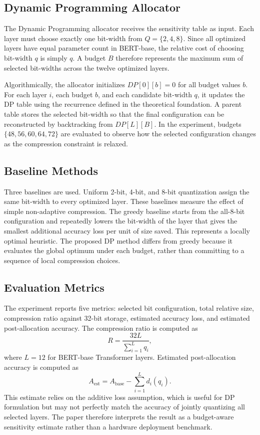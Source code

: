 \documentclass[conference]{IEEEtran}
\begin{document}
\subsection{Dynamic Programming Allocator}
The Dynamic Programming allocator receives the sensitivity table as input. Each layer must choose exactly one bit-width from $Q=\{2,4,8\}$. Since all optimized layers have equal parameter count in BERT-base, the relative cost of choosing bit-width $q$ is simply $q$. A budget $B$ therefore represents the maximum sum of selected bit-widths across the twelve optimized layers.

Algorithmically, the allocator initializes $DP[0][b]=0$ for all budget values $b$. For each layer $i$, each budget $b$, and each candidate bit-width $q$, it updates the DP table using the recurrence defined in the theoretical foundation. A parent table stores the selected bit-width so that the final configuration can be reconstructed by backtracking from $DP[L][B]$. In the experiment, budgets $\{48,56,60,64,72\}$ are evaluated to observe how the selected configuration changes as the compression constraint is relaxed.

\subsection{Baseline Methods}
Three baselines are used. Uniform 2-bit, 4-bit, and 8-bit quantization assign the same bit-width to every optimized layer. These baselines measure the effect of simple non-adaptive compression. The greedy baseline starts from the all-8-bit configuration and repeatedly lowers the bit-width of the layer that gives the smallest additional accuracy loss per unit of size saved. This represents a locally optimal heuristic. The proposed DP method differs from greedy because it evaluates the global optimum under each budget, rather than committing to a sequence of local compression choices.

\subsection{Evaluation Metrics}
The experiment reports five metrics: selected bit configuration, total relative size, compression ratio against 32-bit storage, estimated accuracy loss, and estimated post-allocation accuracy. The compression ratio is computed as
\begin{equation}
R=\frac{32L}{\sum_{i=1}^{L}q_i},
\end{equation}
where $L=12$ for BERT-base Transformer layers. Estimated post-allocation accuracy is computed as
\begin{equation}
A_{\mathrm{est}}=A_{\mathrm{base}}-\sum_{i=1}^{L}d_i(q_i).
\end{equation}
This estimate relies on the additive loss assumption, which is useful for DP formulation but may not perfectly match the accuracy of jointly quantizing all selected layers. The paper therefore interprets the result as a budget-aware sensitivity estimate rather than a hardware deployment benchmark.
\end{document}
